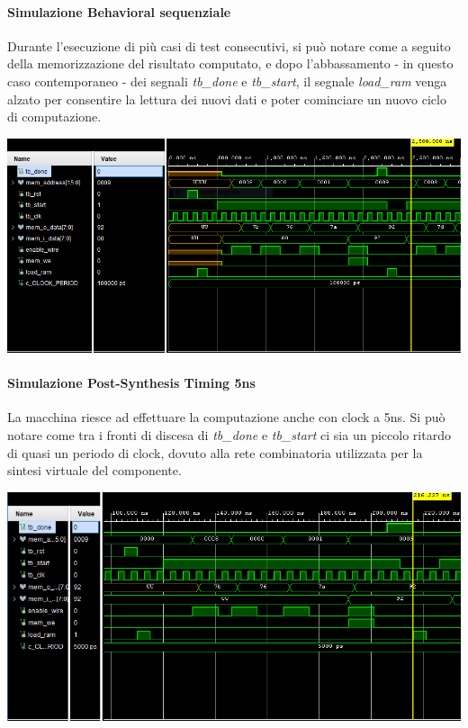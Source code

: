 \documentclass{article}
\begin{document}
\paragraph{Simulazione Behavioral sequenziale}
Durante l'esecuzione di più casi di test consecutivi, si può notare come a seguito della memorizzazione del risultato computato, e dopo l'abbassamento - in questo caso contemporaneo - dei segnali \textit{tb{\_}done} e \textit{tb{\_}start}, il segnale \textit{load{\_}ram} venga alzato per consentire la lettura dei nuovi dati e poter cominciare un nuovo ciclo di computazione.
 
\begin{flushleft}
\includegraphics[scale=0.70]{dettaglio_behavioral} \\
\end{flushleft}

\bigskip
\paragraph{Simulazione Post-Synthesis Timing 5ns}
La macchina riesce ad effettuare la computazione anche con clock a 5ns. Si può notare come tra i fronti di discesa di \textit{tb{\_}done} e \textit{tb{\_}start} ci sia un piccolo ritardo di quasi un periodo di clock, dovuto alla rete combinatoria utilizzata per la sintesi virtuale del componente.

\begin{flushleft}
\includegraphics[scale=0.75]{dettaglio_postSynthesisTiming_5ns} \\
\end{flushleft}
\end{document}
